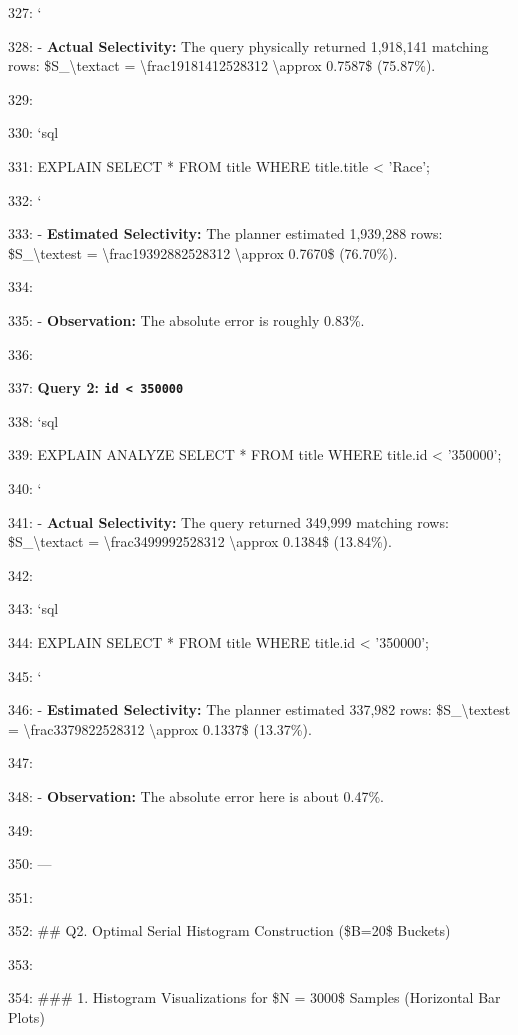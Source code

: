 \documentclass[11pt,a4paper]{article}
\begin{document}
327: \texttt{}`

328: - \textbf{Actual Selectivity:} The query physically returned 1,918,141 matching rows: \$S\_{\textbackslash{}text{act}} = \textbackslash{}frac{1918141}{2528312} \textbackslash{}approx 0.7587\$ (75.87\%).

329:

330: \texttt{}`sql

331: EXPLAIN SELECT * FROM title WHERE title.title < 'Race';

332: \texttt{}`

333: - \textbf{Estimated Selectivity:} The planner estimated 1,939,288 rows: \$S\_{\textbackslash{}text{est}} = \textbackslash{}frac{1939288}{2528312} \textbackslash{}approx 0.7670\$ (76.70\%).

334:

335: - \textbf{Observation:} The absolute error is roughly 0.83\%.

336:

337: \textbf{Query 2: \texttt{id < 350000}}

338: \texttt{}`sql

339: EXPLAIN ANALYZE SELECT * FROM title WHERE title.id < '350000';

340: \texttt{}`

341: - \textbf{Actual Selectivity:} The query returned 349,999 matching rows: \$S\_{\textbackslash{}text{act}} = \textbackslash{}frac{349999}{2528312} \textbackslash{}approx 0.1384\$ (13.84\%).

342:

343: \texttt{}`sql

344: EXPLAIN SELECT * FROM title WHERE title.id < '350000';

345: \texttt{}`

346: - \textbf{Estimated Selectivity:} The planner estimated 337,982 rows: \$S\_{\textbackslash{}text{est}} = \textbackslash{}frac{337982}{2528312} \textbackslash{}approx 0.1337\$ (13.37\%).

347:

348: - \textbf{Observation:} The absolute error here is about 0.47\%.

349:

350: ---

351:

352: \#\# Q2. Optimal Serial Histogram Construction (\$B=20\$ Buckets)

353:

354: \#\#\# 1. Histogram Visualizations for \$N = 3000\$ Samples (Horizontal Bar Plots)
\end{document}
